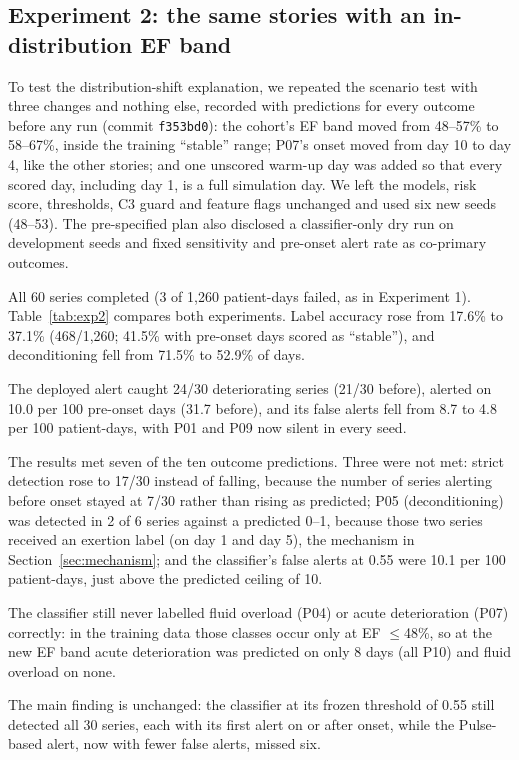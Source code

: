 \documentclass[conference]{IEEEtran}
\newcommand{\code}[1]{\texttt{\footnotesize #1}}
\begin{document}
\subsection{Experiment 2: the same stories with an in-distribution EF band}\label{sec:exp2}
To test the distribution-shift explanation, we repeated the scenario test with three changes and nothing else, recorded with predictions for every outcome before any run (commit \code{f353bd0}): the cohort's EF band moved from 48--57\% to 58--67\%, inside the training ``stable'' range; P07's onset moved from day 10 to day 4, like the other stories; and one unscored warm-up day was added so that every scored day, including day 1, is a full simulation day. We left the models, risk score, thresholds, C3 guard and feature flags unchanged and used six new seeds (48--53). The pre-specified plan also disclosed a classifier-only dry run on development seeds and fixed sensitivity and pre-onset alert rate as co-primary outcomes.

All 60 series completed (3 of 1,260 patient-days failed, as in Experiment 1). Table~\ref{tab:exp2} compares both experiments. Label accuracy rose from 17.6\% to 37.1\% (468/1,260; 41.5\% with pre-onset days scored as ``stable''), and deconditioning fell from 71.5\% to 52.9\% of days.

The deployed alert caught 24/30 deteriorating series (21/30 before), alerted on 10.0 per 100 pre-onset days (31.7 before), and its false alerts fell from 8.7 to 4.8 per 100 patient-days, with P01 and P09 now silent in every seed.

The results met seven of the ten outcome predictions. Three were not met: strict detection rose to 17/30 instead of falling, because the number of series alerting before onset stayed at 7/30 rather than rising as predicted; P05 (deconditioning) was detected in 2 of 6 series against a predicted 0--1, because those two series received an exertion label (on day 1 and day 5), the mechanism in Section~\ref{sec:mechanism}; and the classifier's false alerts at 0.55 were 10.1 per 100 patient-days, just above the predicted ceiling of 10.

The classifier still never labelled fluid overload (P04) or acute deterioration (P07) correctly: in the training data those classes occur only at EF $\leq$48\%, so at the new EF band acute deterioration was predicted on only 8 days (all P10) and fluid overload on none.

The main finding is unchanged: the classifier at its frozen threshold of 0.55 still detected all 30 series, each with its first alert on or after onset, while the Pulse-based alert, now with fewer false alerts, missed six.
\end{document}
